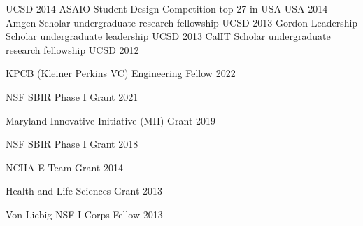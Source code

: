 \begin{cvhonors}
    {UCSD} %
    {2014} %
  \cvhonor
    {ASAIO Student Design Competition} %
    {top 27 in USA} %
    {USA} %
    {2014} %
  \cvhonor
    {Amgen Scholar} %
    {undergraduate research fellowship} %
    {UCSD} %
    {2013} %
  \cvhonor
    {Gordon Leadership Scholar} %
    {undergraduate leadership} %
    {UCSD} %
    {2013} %
  \cvhonor
    {CalIT Scholar} %
    {undergraduate research fellowship} %
    {UCSD} %
    {2012} %
\end{cvhonors}

\begin{cvhonors}
    \cvhonor
    {KPCB (Kleiner Perkins VC) Engineering Fellow} %
    {}
    {}
    {2022} %
    
    \cvhonor
    {NSF SBIR Phase I Grant} %
    {}
    {}
    {2021} %
    
    \cvhonor
    {Maryland Innovative Initiative (MII) Grant} %
    {}
    {}
    {2019} %
    
    \cvhonor
    {NSF SBIR Phase I Grant} %
    {}
    {}
    {2018} %
    
    \cvhonor
    {NCIIA E-Team Grant} %
    {}
    {}
    {2014} %
    
    \cvhonor
    {Health and Life Sciences Grant} %
    {}
    {}
    {2013} %
    
    \cvhonor
    {Von Liebig NSF I-Corps Fellow } %
    {}
    {}
    {2013} %
    
\end{cvhonors}


